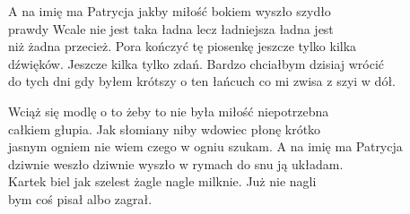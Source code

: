 \begin{text}
{    A na imię ma Patrycja jakby miłość bokiem wyszło szydło\\
    prawdy Wcale nie jest taka ładna lecz ładniejsza ładna jest\\
    niż żadna przecież. Pora kończyć tę piosenkę jeszcze tylko kilka\\
    dźwięków. Jeszcze kilka tylko zdań. Bardzo chciałbym dzisiaj wrócić\\
    do tych dni gdy byłem krótszy o ten łańcuch co mi zwisa z szyi w dół.

    Wciąż się modlę o to żeby to nie była miłość niepotrzebna\\
    całkiem głupia. Jak słomiany niby wdowiec płonę krótko\\
    jasnym ogniem nie wiem czego w ogniu szukam. A na imię ma Patrycja\\
    dziwnie weszło dziwnie wyszło w rymach do snu ją układam.\\
    Kartek biel jak szelest żagle nagle milknie. Już nie nagli\\
    bym coś pisał albo zagrał.
    }
\end{text}
